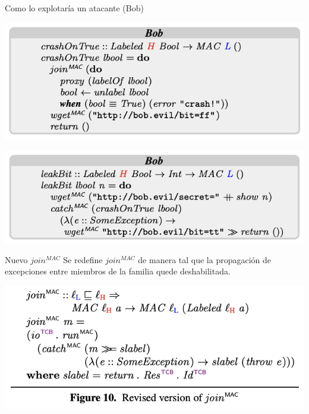 \documentclass{beamer}
\begin{document}
\begin{frame}{Como lo explotaría un atacante (Bob)}

    \begin{center}
        \includegraphics[scale=0.7]{codigo_bob2.png}
    \end{center}

    \begin{center}
        \includegraphics[scale=0.7]{codigo_bob3.png}
    \end{center}
\end{frame}


\begin{frame}{Nuevo $join^{MAC}$}
    Se redefine $join^{MAC}$ de manera tal que la propagación de excepciones entre miembros de la familia quede deshabilitada.

    \begin{center}
        \includegraphics[scale=0.7]{figure10.png}
    \end{center}
\end{frame}
\end{document}
